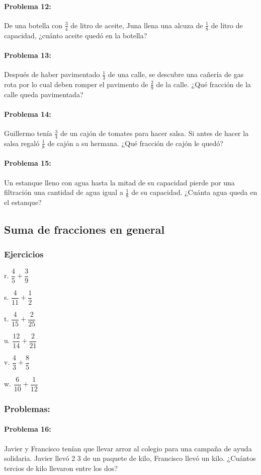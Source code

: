 \documentclass[10pt,twoside]{article}
\begin{document}
\paragraph*{Problema 12:} De una botella con $\frac{3}{4}$ de litro de aceite, Juna llena una alcuza de $\frac{1}{8}$ de litro de capacidad, ¿cuánto aceite quedó en la botella?
\paragraph*{Problema 13:} Después de haber pavimentado $\frac{1}{3}$ de una calle, se descubre una cañería de gas rota por lo cual deben romper el pavimento de $\frac{2}{9}$ de la calle. ¿Qué fracción de la calle queda pavimentada?
\paragraph*{Problema 14:} Guillermo tenía $\frac{3}{4}$ de un cajón de tomates para hacer salsa. Si antes de hacer la salsa regaló $\frac{1}{8}$ de cajón a su hermana. ¿Qué fracción de cajón le quedó?
\paragraph*{Problema 15:} Un estanque lleno con agua hasta la mitad de su capacidad pierde por una filtración una cantidad de agua igual a $\frac{1}{8}$ de su capacidad. ¿Cuánta agua queda en el estanque?
\subsection*{Suma de fracciones en general}
\subsubsection*{Ejercicios}
\begin{enumerate}
\begin{multicols}{3}
\item[r.] $\dfrac{4}{5}+\dfrac{3}{9}$
\item[s.] $\dfrac{4}{11}+\dfrac{1}{2}$
\item[t.] $\dfrac{4}{15}+\dfrac{2}{25}$
\item[u.] $\dfrac{12}{14}+\dfrac{2}{21}$
\item[v.] $\dfrac{4}{3}+\dfrac{8}{5}$
\item[w.] $\dfrac{6}{10}+\dfrac{1}{12}$
\end{multicols}
\end{enumerate}
\subsubsection*{Problemas:}
\paragraph*{Problema 16:} Javier y Francisco tenían que llevar arroz al colegio
para una campaña de ayuda solidaria. Javier llevó
 2
3 de un paquete de kilo, Francisco llevó un kilo.
¿Cuántos tercios de kilo llevaron entre los dos?
\end{document}
